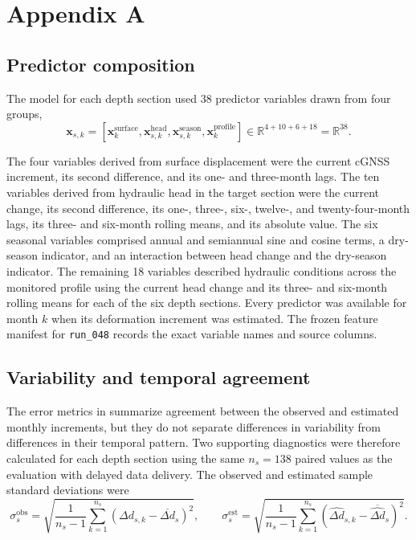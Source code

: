 \section{Appendix A}
\label{app:methods}

\subsection{Predictor composition}
\label{app:predictors}

The model for each depth section used 38 predictor variables drawn from four groups,
\begin{equation}
\boldsymbol{x}_{s,k}
=
\left[
\boldsymbol{x}^{\mathrm{surface}}_{k},
\boldsymbol{x}^{\mathrm{head}}_{s,k},
\boldsymbol{x}^{\mathrm{season}}_{s,k},
\boldsymbol{x}^{\mathrm{profile}}_{k}
\right]
\in
\mathbb{R}^{4+10+6+18}
=
\mathbb{R}^{38}.
\label{eq:predictor_composition}
\end{equation}

The four variables derived from surface displacement were the current cGNSS increment, its second difference, and its one- and three-month lags. The ten variables derived from hydraulic head in the target section were the current change, its second difference, its one-, three-, six-, twelve-, and twenty-four-month lags, its three- and six-month rolling means, and its absolute value. The six seasonal variables comprised annual and semiannual sine and cosine terms, a dry-season indicator, and an interaction between head change and the dry-season indicator. The remaining 18 variables described hydraulic conditions across the monitored profile using the current head change and its three- and six-month rolling means for each of the six depth sections. Every predictor was available for month $k$ when its deformation increment was estimated. The frozen feature manifest for \texttt{run\_048} records the exact variable names and source columns.

\subsection{Variability and temporal agreement}
\label{app:variability_diagnostics}

The error metrics in  summarize agreement between the observed and estimated monthly increments, but they do not separate differences in variability from differences in their temporal pattern. Two supporting diagnostics were therefore calculated for each depth section using the same $n_s=138$ paired values as the evaluation with delayed data delivery. The observed and estimated sample standard deviations were
\begin{equation}
\sigma_{s}^{\mathrm{obs}}
=
\sqrt{
\frac{1}{n_s-1}
\sum_{k=1}^{n_s}
\left(
\Delta d_{s,k}-\overline{\Delta d}_{s}
\right)^2
},
\qquad
\sigma_{s}^{\mathrm{est}}
=
\sqrt{
\frac{1}{n_s-1}
\sum_{k=1}^{n_s}
\left(
\widehat{\Delta d}_{s,k}-\overline{\widehat{\Delta d}}_{s}
\right)^2
}.
\label{eq:observed_estimated_variability}
\end{equation}

